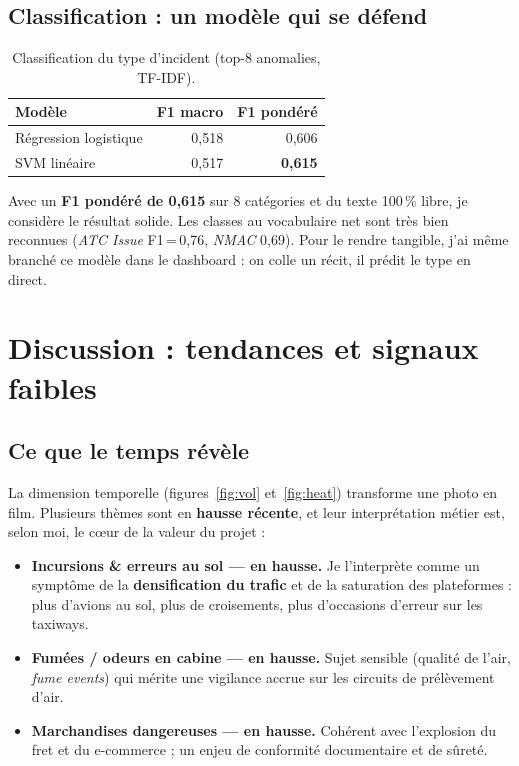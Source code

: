 \documentclass[11pt,a4paper]{article}
\begin{document}
\subsection{Classification : un modèle qui se défend}
\begin{table}[h]\centering\small
\caption{Classification du type d'incident (top-8 anomalies, TF-IDF).}\label{tab:clf}
\begin{tabular}{lrr}
\toprule
\textbf{Modèle} & \textbf{F1 macro} & \textbf{F1 pondéré} \\
\midrule
Régression logistique & 0,518 & 0,606 \\
SVM linéaire & 0,517 & \textbf{0,615} \\
\bottomrule
\end{tabular}
\end{table}
Avec un \textbf{F1 pondéré de 0,615} sur 8 catégories et du texte 100\,\% libre, je
considère le résultat solide. Les classes au vocabulaire net sont très bien reconnues
(\emph{ATC Issue} F1\,=\,0,76, \emph{NMAC} 0,69). Pour le rendre tangible, j'ai même
branché ce modèle dans le dashboard : on colle un récit, il prédit le type en direct.

\section{Discussion : tendances et signaux faibles}

\subsection{Ce que le temps révèle}
La dimension temporelle (figures~\ref{fig:vol} et~\ref{fig:heat}) transforme une photo en
film. Plusieurs thèmes sont en \textbf{hausse récente}, et leur interprétation métier est,
selon moi, le c\oe ur de la valeur du projet :
\begin{itemize}[leftmargin=1.4em]
  \item \textbf{Incursions \& erreurs au sol — en hausse.} Je l'interprète comme un symptôme
  de la \textbf{densification du trafic} et de la saturation des plateformes : plus d'avions
  au sol, plus de croisements, plus d'occasions d'erreur sur les taxiways.
  \item \textbf{Fumées / odeurs en cabine — en hausse.} Sujet sensible (qualité de l'air,
  \emph{fume events}) qui mérite une vigilance accrue sur les circuits de prélèvement d'air.
  \item \textbf{Marchandises dangereuses — en hausse.} Cohérent avec l'explosion du fret et
  du e-commerce ; un enjeu de conformité documentaire et de sûreté.
\end{itemize}
\end{document}
